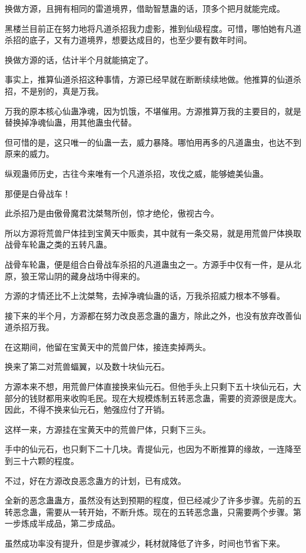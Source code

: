 \begin{this_body}
换做方源，且拥有相同的雷道境界，借助智慧蛊的话，顶多个把月就能完成。

黑楼兰目前正在努力地将凡道杀招我力虚影，推到仙级程度。可惜，哪怕她有凡道杀招的底子，又有力道境界，想要达成目的，也至少要有数年时间。

换做方源的话，估计半个月就能搞定了。

事实上，推算仙道杀招这种事情，方源已经早就在断断续续地做。他推算的仙道杀招，不是别的，真是万我。

万我的原本核心仙蛊净魂，因为饥饿，不堪催用。方源推算万我的主要目的，就是替换掉净魂仙蛊，用其他蛊虫代替。

但可惜的是，这只唯一的仙蛊一去，威力暴降。哪怕用再多的凡道蛊虫，也达不到原来的威力。

纵观蛊师历史，古往今来唯有一个凡道杀招，攻伐之威，能够媲美仙蛊。

那便是白骨战车！

此杀招乃是由傲骨魔君沈桀骜所创，惊才绝伦，傲视古今。

所以方源将荒兽尸体挂到宝黄天中贩卖，其中就有一条交易，就是用荒兽尸体换取战骨车轮蛊之类的五转凡蛊。

战骨车轮蛊，便是组合白骨战车杀招的凡道蛊虫之一。方源手中仅有一件，是从北原，狼王常山阴的藏身战场中得来的。

方源的才情还比不上沈桀骜，去掉净魂仙蛊的话，万我杀招威力根本不够看。

接下来的半个月，方源都在努力改良恶念蛊的蛊方，除此之外，也没有放弃改善仙道杀招万我。

在这期间，他留在宝黄天中的荒兽尸体，接连卖掉两头。

换来了第二对荒兽蝠翼，以及数十块仙元石。

方源本来不想，用荒兽尸体直接换来仙元石。但他手头上只剩下五十块仙元石，大部分的钱财都用来收购毛民。现在大规模炼制五转恶念蛊，需要的资源很是庞大。因此，不得不换来仙元石，勉强应付了开销。

这样一来，方源挂在宝黄天中的荒兽尸体，只剩下三头。

手中的仙元石，也只剩下二十几块。青提仙元，也因为不断推算的缘故，一连降至到三十六颗的程度。

不过，好在方源改良恶念蛊方的计划，已有成效。

全新的恶念蛊蛊方，虽然没有达到预期的程度，但已经减少了许多步骤。先前的五转恶念蛊，需要从一转开始，不断升炼。现在的五转恶念蛊，只需要两个步骤。第一步炼成半成品，第二步成品。

虽然成功率没有提升，但是步骤减少，耗材就降低了许多，时间也节省下来。


\end{this_body}
